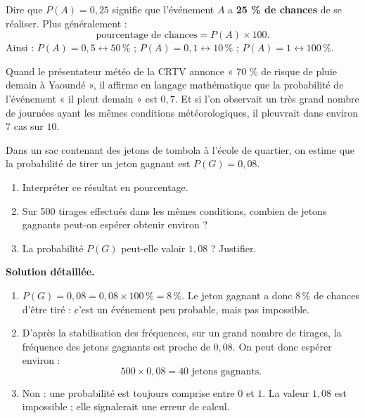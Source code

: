 \documentclass[11pt]{article}
\begin{document}
\begin{aretenir}
Dire que $P(A) = 0,25$ signifie que l'événement $A$ a \textbf{25 \% de chances} de se réaliser. Plus généralement :
\[ \text{pourcentage de chances} = P(A) \times 100. \]
Ainsi : $P(A) = 0,5 \leftrightarrow 50\,\%$ ; $P(A) = 0,1 \leftrightarrow 10\,\%$ ; $P(A) = 1 \leftrightarrow 100\,\%$.
\end{aretenir}

Quand le présentateur météo de la CRTV annonce « 70 \% de risque de pluie demain à Yaoundé », il affirme en langage mathématique que la probabilité de l'événement « il pleut demain » est $0,7$. Et si l'on observait un très grand nombre de journées ayant les mêmes conditions météorologiques, il pleuvrait dans environ $7$ cas sur $10$.

\begin{exoresolu}
Dans un sac contenant des jetons de tombola à l'école de quartier, on estime que la probabilité de tirer un jeton gagnant est $P(G) = 0,08$.
\begin{enumerate}
\item Interpréter ce résultat en pourcentage.
\item Sur 500 tirages effectués dans les mêmes conditions, combien de jetons gagnants peut-on espérer obtenir environ ?
\item La probabilité $P(G)$ peut-elle valoir $1,08$ ? Justifier.
\end{enumerate}
\tcblower
\textbf{Solution détaillée.}
\begin{enumerate}
\item $P(G) = 0,08 = 0,08 \times 100\,\% = 8\,\%$. Le jeton gagnant a donc $8\,\%$ de chances d'être tiré : c'est un événement peu probable, mais pas impossible.
\item D'après la stabilisation des fréquences, sur un grand nombre de tirages, la fréquence des jetons gagnants est proche de $0,08$. On peut donc espérer environ :
\[ 500 \times 0,08 = 40 \text{ jetons gagnants.} \]
\item Non : une probabilité est toujours comprise entre $0$ et $1$. La valeur $1,08$ est impossible ; elle signalerait une erreur de calcul.
\end{enumerate}
\end{exoresolu}
\end{document}
